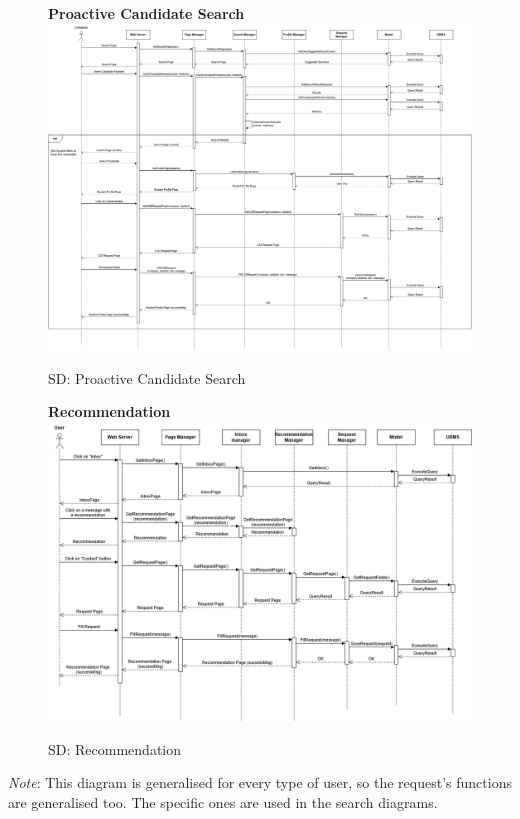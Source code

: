 \begin{figure}[H]
\textbf{Proactive Candidate Search}\newline\newline
\includegraphics[width=15cm]{images/architectural design/runtime/DD-UC12.drawio.png}
    \caption{SD: Proactive Candidate Search}
\end{figure}

\begin{figure}[H]
\textbf{Recommendation}\newline\newline
\includegraphics[width=15cm]{images/architectural design/runtime/DD-UC13.drawio.png}
    \caption{SD: Recommendation}
\end{figure}
\textit{Note}: This diagram is generalised for every type of user, so the request's functions are generalised too. The specific ones are used in the search diagrams.

